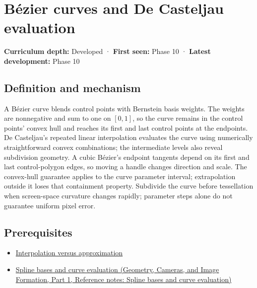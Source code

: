 \hypertarget{appendix-ddbec701898c}{}\label{referencestart:appendix-ddbec701898c}
\section{Bézier curves and De Casteljau evaluation}\label{appendix-ddbec701898c-buxe9zier-curves-and-de-casteljau-evaluation}

\hypertarget{appendix-ddbec701898c-bézier-curves-and-de-casteljau-evaluation}{}

\textbf{Curriculum depth:} Developed · \textbf{First seen:} Phase 10 · \textbf{Latest development:} Phase 10

\begin{allmightroledefinition}

\subsection{Definition and mechanism}\label{appendix-ddbec701898c-definition-and-mechanism}

\hypertarget{appendix-ddbec701898c-definition-and-mechanism}{}

A Bézier curve blends control points with Bernstein basis weights. The weights are nonnegative and sum to one on \([0,1]\), so the curve remains in the control points' convex hull and reaches its first and last control points at the endpoints. De Casteljau's repeated linear interpolation evaluates the curve using numerically straightforward convex combinations; the intermediate levels also reveal subdivision geometry. A cubic Bézier's endpoint tangents depend on its first and last control-polygon edges, so moving a handle changes direction and scale. The convex-hull guarantee applies to the curve parameter interval; extrapolation outside it loses that containment property. Subdivide the curve before tessellation when screen-space curvature changes rapidly; parameter steps alone do not guarantee uniform pixel error.

\end{allmightroledefinition}

\subsection{Prerequisites}\label{appendix-ddbec701898c-prerequisites}

\hypertarget{appendix-ddbec701898c-prerequisites}{}

\begin{itemize}
\tightlist
\item
  \hyperref[appendix-0c2a5f69851e]{Interpolation versus approximation}
\item
  \href{../03-Geometry-Cameras-and-Image-Formation-P01/main.pdf\#nameddest=appendix-f28eeec97a3d}{Spline bases and curve evaluation (Geometry, Cameras, and Image Formation, Part 1, Reference notes: Spline bases and curve evaluation)}
\end{itemize}

